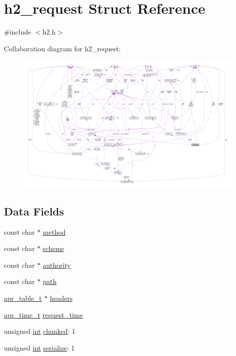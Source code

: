 \hypertarget{structh2__request}{}\section{h2\+\_\+request Struct Reference}
\label{structh2__request}


{\ttfamily \#include $<$h2.\+h$>$}



Collaboration diagram for h2\+\_\+request\+:
\nopagebreak
\begin{figure}[H]
\begin{center}
\leavevmode
\includegraphics[width=350pt]{structh2__request__coll__graph}
\end{center}
\end{figure}
\subsection*{Data Fields}
\begin{DoxyCompactItemize}
\item 
const char $\ast$ \hyperlink{structh2__request_a1f2c96a3b6f846ebb17355b6bb17a70c}{method}
\item 
const char $\ast$ \hyperlink{structh2__request_a601afd08b5f27bf7920ea62e8d97ffd7}{scheme}
\item 
const char $\ast$ \hyperlink{structh2__request_a372a346fdb9b50c1c3cde7e7e6a24f99}{authority}
\item 
const char $\ast$ \hyperlink{structh2__request_a96eb1a82bf08e7d6b0320fd96bc80ca4}{path}
\item 
\hyperlink{structapr__table__t}{apr\+\_\+table\+\_\+t} $\ast$ \hyperlink{structh2__request_a9b340c8f203a87d7c599ced240a829ec}{headers}
\item 
\hyperlink{group__apr__time_gadb4bde16055748190eae190c55aa02bb}{apr\+\_\+time\+\_\+t} \hyperlink{structh2__request_adaa05fcdc45ee82f557ae390d1e14f1a}{request\+\_\+time}
\item 
unsigned \hyperlink{pcre_8txt_a42dfa4ff673c82d8efe7144098fbc198}{int} \hyperlink{structh2__request_a3dde46ef74e22353622855f1fda1f6ef}{chunked}\+: 1
\item 
unsigned \hyperlink{pcre_8txt_a42dfa4ff673c82d8efe7144098fbc198}{int} \hyperlink{structh2__request_acb093d2b49d76dc171a6796b59ba7fdb}{serialize}\+: 1
\end{DoxyCompactItemize}


